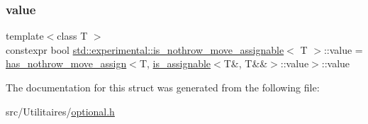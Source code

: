 \subsubsection{\texorpdfstring{value}{value}}
{\footnotesize\ttfamily template$<$class T $>$ \\
constexpr bool \mbox{\hyperlink{structstd_1_1experimental_1_1is__nothrow__move__assignable}{std\+::experimental\+::is\+\_\+nothrow\+\_\+move\+\_\+assignable}}$<$ T $>$\+::value = \mbox{\hyperlink{structstd_1_1experimental_1_1is__nothrow__move__assignable_1_1has__nothrow__move__assign}{has\+\_\+nothrow\+\_\+move\+\_\+assign}}$<$T, \mbox{\hyperlink{structstd_1_1experimental_1_1is__assignable}{is\+\_\+assignable}}$<$T\&, T\&\&$>$\+::value$>$\+::value\hspace{0.3cm}{\ttfamily [static]}}



The documentation for this struct was generated from the following file\+:\begin{DoxyCompactItemize}
\item 
src/\+Utilitaires/\mbox{\hyperlink{optional_8h}{optional.\+h}}\end{DoxyCompactItemize}
